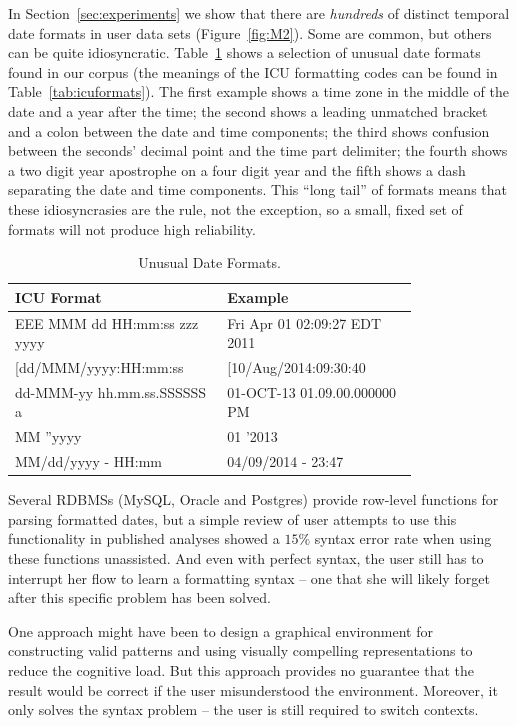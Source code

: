 In Section~\ref{sec:experiments} we show that there are \emph{hundreds} of distinct temporal date formats in user data sets (Figure~\ref{fig:M2}).
Some are common, but others can be quite idiosyncratic. 
Table~\ref{tab:dateformats} shows a selection of unusual date formats found in our corpus (the meanings of the ICU formatting codes can be found in Table~\ref{tab:icuformats}). 
The first example shows a time zone in the middle of the date and a year after the time; 
the second shows a leading unmatched bracket and a colon between the date and time components; 
the third shows confusion between the seconds' decimal point and the time part delimiter; 
the fourth shows a two digit year apostrophe on a four digit year and the fifth shows a dash separating the date and time components. 
This ``long tail'' of formats means that these idiosyncrasies are the rule, not the exception, 
so a small, fixed set of formats will not produce high reliability.

\begin{table}[ht]
\centering
\bgroup
\def\arraystretch{1.5}
\begin{tabular}{|p{0.4\linewidth}| p{0.4\linewidth}|}
\hline
\centering
\textbf{ICU Format} & \textbf{Example}\\ \hline
\scriptsize{EEE MMM dd HH:mm:ss zzz yyyy} & \scriptsize{Fri Apr 01 02:09:27 EDT 2011}\\ \hline
\scriptsize{[dd/MMM/yyyy:HH:mm:ss} & \scriptsize{[10/Aug/2014:09:30:40}\\ \hline
\scriptsize{dd-MMM-yy hh.mm.ss.SSSSSS a} & \scriptsize{01-OCT-13 01.09.00.000000 PM}\\ \hline
\scriptsize{MM ''yyyy} & \scriptsize{01 '2013}\\ \hline
\scriptsize{MM/dd/yyyy - HH:mm} & \scriptsize{04/09/2014 - 23:47}\\ \hline
\end{tabular}
\egroup
\caption{Unusual Date Formats.}
\label{tab:dateformats}
\end{table}

Several RDBMSs (\eg MySQL, Oracle and Postgres) provide row-level functions for parsing formatted dates, but a simple review of user attempts to use this functionality in published analyses showed a $15\%$ syntax error rate when using these functions unassisted. And even with perfect syntax, the user still has to interrupt her flow to learn a formatting syntax -- one that she will likely forget after this specific problem has been solved.

One approach might have been to design a graphical environment for constructing valid patterns and using visually compelling representations to reduce the cognitive load. 
But this approach provides no guarantee that the result would be correct if the user misunderstood the environment. 
Moreover, it only solves the syntax problem -- the user is still required to switch contexts.

